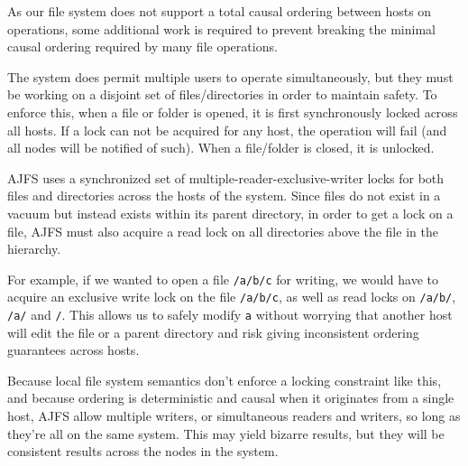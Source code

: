 As our file system does not support a total causal ordering between hosts on
operations, some additional work is required to prevent breaking the minimal
causal ordering required by many file operations.

The system does permit multiple users to operate simultaneously, but they must
be working on a disjoint set of files/directories in order to maintain safety.
To enforce this, when a file or folder is opened, it is first synchronously
locked across all hosts. If a lock can not be acquired for any host, the
operation will fail (and all nodes will be notified of such). When a file/folder
is closed, it is unlocked.

AJFS uses a synchronized set of multiple-reader-exclusive-writer locks for both
files and directories across the hosts of the system. Since files do not exist
in a vacuum but instead exists within its parent directory, in order to get a
lock on a file, AJFS must also acquire a read lock on all directories above the
file in the hierarchy.

For example, if we wanted to open a file \texttt{/a/b/c} for writing, we would
have to acquire an exclusive write lock on the file \texttt{/a/b/c}, as well as
read locks on \texttt{/a/b/}, \texttt{/a/} and \texttt{/}. This allows us to
safely modify \texttt{a} without worrying that another host will edit the file
or a parent directory and risk giving inconsistent ordering guarantees across
hosts.

Because local file system semantics don't enforce a locking constraint like
this, and because ordering is deterministic and causal when it originates from
a single host, AJFS allow multiple writers, or simultaneous readers and writers,
so long as they're all on the same system. This may yield bizarre results, but
they will be consistent results across the nodes in the system.
